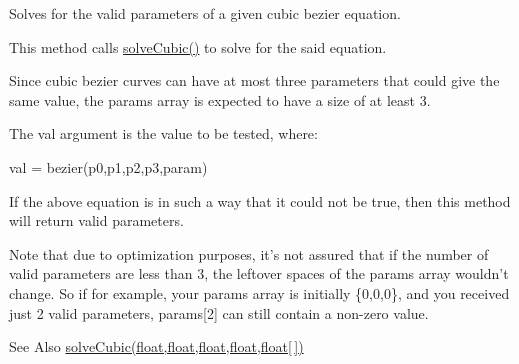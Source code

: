 Solves for the valid parameters of a given cubic bezier equation. 

This method calls {\ttfamily \hyperlink{classhype_1_1util_1_1_h_math_a505f12b6206cede660900972055aae67}{solve\-Cubic()}} to solve for the said equation.

Since cubic bezier curves can have at most three parameters that could give the same value, the {\ttfamily params} array is expected to have a size of at least 3.

The {\ttfamily val} argument is the value to be tested, where\-: \begin{DoxyVerb}val = bezier(p0,p1,p2,p3,param)
\end{DoxyVerb}


If the above equation is in such a way that it could not be true, then this method will return {} valid parameters.

Note that due to optimization purposes, it's not assured that if the number of valid parameters are less than 3, the leftover spaces of the {\ttfamily params} array wouldn't change. So if for example, your {\ttfamily params} array is initially {\ttfamily \{0,0,0\}}, and you received just 2 valid parameters, {\ttfamily params\mbox{[}2\mbox{]}} can still contain a non-\/zero value.

\begin{DoxySeeAlso}{See Also}
\hyperlink{classhype_1_1util_1_1_h_math_a505f12b6206cede660900972055aae67}{solve\-Cubic(float,float,float,float,float\mbox{[}$\,$\mbox{]})} 
\end{DoxySeeAlso}

